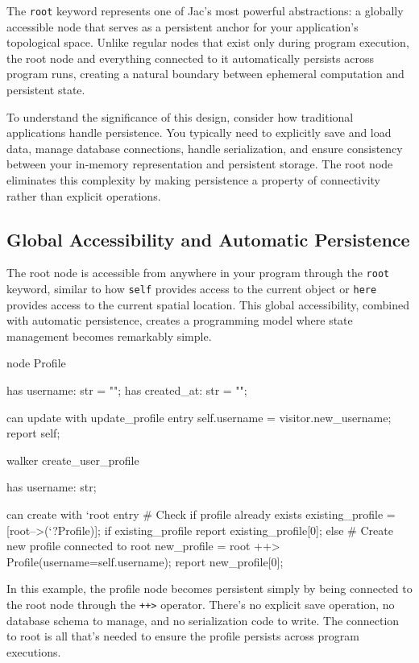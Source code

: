 The \texttt{root} keyword represents one of Jac's most powerful abstractions: a globally accessible node that serves as a persistent anchor for your application's topological space. Unlike regular nodes that exist only during program execution, the root node and everything connected to it automatically persists across program runs, creating a natural boundary between ephemeral computation and persistent state.

To understand the significance of this design, consider how traditional applications handle persistence. You typically need to explicitly save and load data, manage database connections, handle serialization, and ensure consistency between your in-memory representation and persistent storage. The root node eliminates this complexity by making persistence a property of connectivity rather than explicit operations.

\subsection{Global Accessibility and Automatic Persistence}

The root node is accessible from anywhere in your program through the \texttt{root} keyword, similar to how \texttt{self} provides access to the current object or \texttt{here} provides access to the current spatial location. This global accessibility, combined with automatic persistence, creates a programming model where state management becomes remarkably simple.

\begin{jacblock}
node Profile {
    has username: str = "";
    has created_at: str = "";

    can update with update_profile entry {
        self.username = visitor.new_username;
        report self;
    }
}

walker create_user_profile {
    has username: str;

    can create with `root entry {
        # Check if profile already exists
        existing_profile = [root-->(`?Profile)];
        if existing_profile {
            report existing_profile[0];
        } else {
            # Create new profile connected to root
            new_profile = root ++> Profile(username=self.username);
            report new_profile[0];
        }
    }
}
\end{jacblock}

In this example, the profile node becomes persistent simply by being connected to the root node through the \texttt{++>} operator. There's no explicit save operation, no database schema to manage, and no serialization code to write. The connection to root is all that's needed to ensure the profile persists across program executions.

